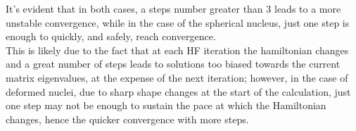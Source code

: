 It's evident that in both cases, a steps number greater than $3$ leads to a more unstable convergence, while in the case of the spherical nucleus, just one step is enough to quickly, and safely, reach convergence.
\\This is likely due to the fact that at each HF iteration the hamiltonian changes and a great number of steps leads to solutions too biased towards the current matrix eigenvalues, at the expense of the next iteration; however, in the case of deformed nuclei, due to sharp shape changes at the start of the calculation, just one step may not be enough to sustain the pace at which the Hamiltonian changes, hence the quicker convergence with more steps.



